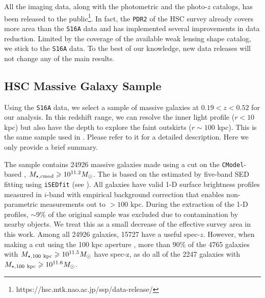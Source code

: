 \documentclass[fleqn,usenatbib,useAMS,english]{mnras}
\begin{document}
    All the imaging data, along with the photometric and the photo-$z$ catalogs, has been released
    to the public\footnote{https://hsc.mtk.nao.ac.jp/ssp/data-release/}.
    In fact, the \texttt{PDR2} of the HSC survey already covers more area than the \texttt{S16A}
    data and has implemented several improvements in data reduction.
    Limited by the coverage of the available weak lensing shape catalog, we stick to the
    \texttt{S16A} data. To the best of our knowledge, new data releases will not change any of
    the main results.

\subsection{HSC Massive Galaxy Sample}
    \label{sec:galaxy_sample}

    Using the \texttt{S16A} data, we select a sample of massive galaxies at $0.19 < z <
    0.52$ for our analysis.
    In this redshift range, we can resolve the inner light profile ($r<10$ kpc) but also have the
    depth to explore the faint outskirts ($r \sim 100$ kpc).
    This is the same sample used in \citet{Huang2020}. Please refer to it for a detailed
    description. Here we only provide a brief summary.

    The sample contains 24926 massive galaxies made using a cut on the \texttt{CModel}-based \mstar{},
    $M_{\star,\mathrm{cmod}}{} \geqslant 10^{11.2} M_{\odot}$.
    The \mcmodel{} is based on the \mlratio{} estimated by five-band SED fitting using
    \texttt{iSEDfit} (see \citealt{Moustakas2013}).
    All galaxies have valid 1-D surface brightness profiles measured in $i$-band with empirical
    background correction that enables non-parametric \mstar{} measurements out to $>100$ kpc.
    During the extraction of the 1-D profiles, $\sim 9$\% of the original sample was excluded due to
    contamination by nearby objects. We treat this as a small decrease of the effective survey
    area in this work.
    Among all 24926 galaxies, 15727 have a useful spec-$z$.
    However, when making a cut using the 100 kpc aperture \mstar{}, more than $90$\%
    of the 4765 galaxies with $M_{\star, {100}\ \rm kpc} \geqslant 10^{11.5} M_{\odot}$ have spec-z,
    as do all of the 2247 galaxies with $M_{\star, {100}\ \rm kpc} \geqslant 10^{11.6} M_{\odot}$.
\end{document}
